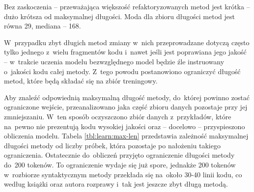 \documentclass[twoside]{praca}
\begin{document}
Bez zaskoczenia -- przeważająca większość refaktoryzowanych metod jest krótka -- dużo krótsza od maksymalnej długości. Moda dla zbioru długości metod jest równa 29, mediana -- 168. 

W~przypadku zbyt długich metod zmiany w~nich przeprowadzane dotyczą często tylko jednego z~wielu fragmentów kodu i~nawet jeśli jest poprawiana jego jakość -- w~trakcie uczenia modelu bezwzględnego model będzie źle instruowany o~jakości kodu całej metody. Z~tego powodu postanowiono ograniczyć długość metod, które będą składać się na zbiór treningowy.

Aby znaleźć odpowiednią maksymalną długość metody, do~której powinno zostać ograniczone wejście, przeanalizowano jaka część zbioru danych pozostaje przy jej zmniejszaniu. W~ten sposób oczyszczono zbiór danych z~przykładów, które na~pewno nie prezentują kodu wysokiej jakości oraz -- docelowo -- przyspieszono obliczenia modelu. Tabela \ref{tbl:learn:max-len} przedstawia zależność maksymalnej długości metody od liczby próbek, która pozostaje po nałożeniu takiego ograniczenia. Ostatecznie do~obliczeń przyjęto ograniczenie długości metody do~200 tokenów. To ograniczenie wydaje się już spore, jednakże 200 tokenów w~rozbiorze syntaktycznym metody przekłada się na~około 30-40 linii kodu, co według książki \cite{martin2009clean} oraz autora rozprawy i~tak jest jeszcze zbyt długą metodą.
\end{document}
